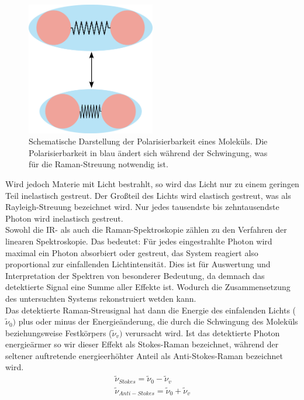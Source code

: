 \begin{figure}[H]
    \centering
    \includegraphics[width=0.5\textwidth]{1_Skript/Inkscape/Polarisierbarkeit.png}
    \caption{Schematische Darstellung der Polarisierbarkeit eines Moleküls. Die Polarisierbarkeit  in blau  ändert sich während der Schwingung, was für die Raman-Streuung notwendig ist.}
    \label{fig:Polarisierbarkeit}
\end{figure}

Wird jedoch Materie mit Licht bestrahlt, so wird das Licht nur zu einem geringen Teil inelastisch gestreut. Der Großteil des Lichts wird elastisch gestreut, was als Rayleigh-Streuung bezeichnet wird.
Nur jedes tausendste bis zehntausendste Photon wird inelastisch gestreut.\\
Sowohl die IR- als auch die Raman-Spektroskopie zählen zu den Verfahren der linearen Spektroskopie.
Das bedeutet: Für jedes eingestrahlte Photon wird maximal ein Photon absorbiert oder gestreut, das System reagiert also proportional zur einfallenden Lichtintensität. Dies ist für 
Auswertung und Interpretation der Spektren von besonderer Bedeutung, da demnach das detektierte Signal eine Summe aller Effekte ist. Wodurch die Zusammensetzung des untersuchten Systems 
rekonstruiert wetden kann.\\

Das detektierte Raman-Streusignal hat dann die Energie des einfalenden Lichts ($\tilde{\nu}_0)$ plus oder minus der Energieänderung, die durch die Schwingung 
des Moleküls beziehungsweise Festkörpers ($\tilde{\nu}_v)$ verursacht wird.
Ist das detektierte Photon energieärmer so wir dieser Effekt als Stokes-Raman bezeichnet, während der seltener auftretende energieerhöhter Anteil als Anti-Stokes-Raman bezeichnet wird.
\begin{eqnarray}
    \tilde{\nu}_{Stokes} = \tilde{\nu}_0 - \tilde{\nu}_v 
    \label{eq:stokes} \\
    \tilde{\nu}_{Anti-Stokes} = \tilde{\nu}_0 + \tilde{\nu}_v
    \label{eq:anti-stokes}  
\end{eqnarray}

